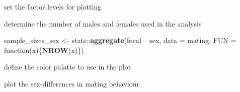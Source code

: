 \documentclass[]{article}
\newenvironment{Shaded}{\begin{snugshade}}{\end{snugshade}}
\newcommand{\KeywordTok}[1]{\textcolor[rgb]{0.13,0.29,0.53}{\textbf{{#1}}}}
\newcommand{\DataTypeTok}[1]{\textcolor[rgb]{0.13,0.29,0.53}{{#1}}}
\newcommand{\StringTok}[1]{\textcolor[rgb]{0.31,0.60,0.02}{{#1}}}
\newcommand{\NormalTok}[1]{{#1}}
\begin{document}
set the factor levels for plotting

\begin{Shaded}
\end{Shaded}

determine the number of males and females used in the analysis

\begin{Shaded}
\begin{Highlighting}[]
\NormalTok{sample_sizes_sex <-}\StringTok{ }
\StringTok{  }\NormalTok{stats::}\KeywordTok{aggregate}\NormalTok{(focal ~}\StringTok{ }\NormalTok{sex, }\DataTypeTok{data =} \NormalTok{mating, }\DataTypeTok{FUN =} \NormalTok{function(x)\{}\KeywordTok{NROW}\NormalTok{(x)\})}
\end{Highlighting}
\end{Shaded}

define the color palatte to use in the plot

\begin{Shaded}
\end{Shaded}

plot the sex-differences in mating behaviour
\end{document}
